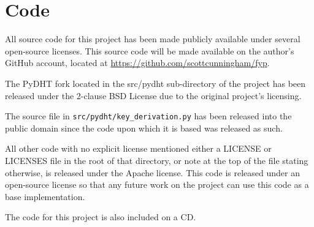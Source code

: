 
\chapter{Code}

All source code for this project has been made publicly available under several open-source licenses.
This source code will be made available on the author's GitHub account, located at
\url{https://github.com/scottcunningham/fyp}.

The PyDHT fork located in the src/pydht sub-directory of the project has been released under
the 2-clause BSD License due to the original project's licensing.

The source file in \texttt{src/pydht/key\_derivation.py} has been released into the public domain since
the code upon which it is based was released as such.

All other code with no explicit license mentioned either a LICENSE or LICENSES file in the root of that
directory, or note at the top of the file stating otherwise, is released under the Apache license.
This code is released under an open-source license so that any future work on the project
can use this code as a base implementation.

The code for this project is also included on a CD.

